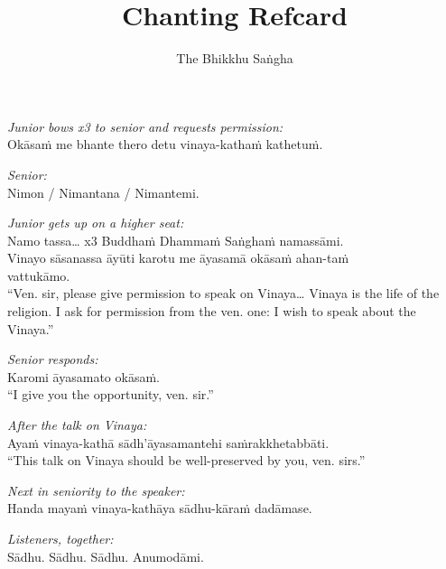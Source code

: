 \documentclass[10pt,oneside]{memoir}
\title{Chanting Refcard}
\author{The Bhikkhu Saṅgha}
\begin{document}
\begin{hangparas}{1em}{1}

\emph{Junior bows x3 to senior and requests permission:}\\
Okāsaṁ me bhante thero detu vinaya-kathaṁ kathetuṁ.

\emph{Senior:}\\
Nimon / Nimantana / Nimantemi.

\emph{Junior gets up on a higher seat:}\\
Namo tassa\ldots{} x3 Buddhaṁ Dhammaṁ Saṅghaṁ namassāmi.\\
Vinayo sāsanassa āyūti karotu me āyasamā okāsaṁ ahan-taṁ\\ vattukāmo.\\[5pt]
``Ven. sir, please give permission to speak on Vinaya\ldots{} Vinaya is the
life of the religion. I ask for permission from the ven. one: I wish
to speak about the Vinaya.''

\emph{Senior responds:}\\
Karomi āyasamato okāsaṁ.\\[5pt]
``I give you the opportunity, ven. sir.''

\emph{After the talk on Vinaya:}\\
Ayaṁ vinaya-kathā sādh'āyasamantehi saṁrakkhetabbāti.\\[5pt]
``This talk on Vinaya should be well-preserved by you, ven. sirs.''

\emph{Next in seniority to the speaker:}\\
Handa mayaṁ vinaya-kathāya sādhu-kāraṁ dadāmase.

\emph{Listeners, together:}\\
Sādhu. Sādhu. Sādhu. Anumodāmi.

\end{hangparas}
\end{document}
